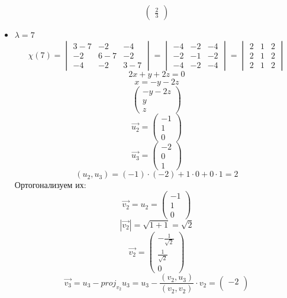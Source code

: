 \begin{itemize}
$$\begin{pmatrix}
        \frac23
    \end{pmatrix} $$
    \item $ \lambda = 7 $
    $$ \chi(7) =
    \begin{vmatrix}
    	3 - 7 & -2 & -4 \\
        -2 & 6 - 7 & -2 \\
        -4 & -2 & 3 - 7
    \end{vmatrix} =
    \begin{vmatrix}
    	-4 & -2 & -4 \\
        -2 & -1 & -2 \\
        -4 & -2 & -4
    \end{vmatrix} =
    \begin{vmatrix}
    	2 & 1 & 2 \\
        2 & 1 & 2 \\
        2 & 1 & 2
    \end{vmatrix} $$
    $$ 2x + y + 2z = 0 $$
    $$ x = -y - 2z $$
    $$
    \begin{pmatrix}
    	-y -2z \\
        y \\
        z
    \end{pmatrix} $$
    $$ \vec{u_2} =
    \begin{pmatrix}
    	-1 \\
        1 \\
        0
    \end{pmatrix} $$
    $$ \vec{u_3} =
    \begin{pmatrix}
    	-2 \\
        0 \\
        1
    \end{pmatrix} $$
    $$ (u_2, u_3) = (-1) \cdot (-2) + 1 \cdot 0 + 0 \cdot 1 = 2 $$
    Ортогонализуем их:
    $$ \vec{v_2} = u_2 =
    \begin{pmatrix}
    	-1 \\
        1 \\
        0
    \end{pmatrix} $$
    $$ |\vec{v_2}| = \sqrt{1 + 1} = \sqrt2 $$
    $$ \vec{v_2} =
    \begin{pmatrix}
        -\frac1{\sqrt2} \\
        \frac1{\sqrt2} \\
        0
    \end{pmatrix} $$
    $$ \vec{v_3} = u_3 - proj_{v_2}u_3 = u_3 - \frac{(v_2, u_3)}{(v_2, v_2)} \cdot v_2 =
    \begin{pmatrix}
    	-2 \\

\end{pmatrix}$$
\end{itemize}
